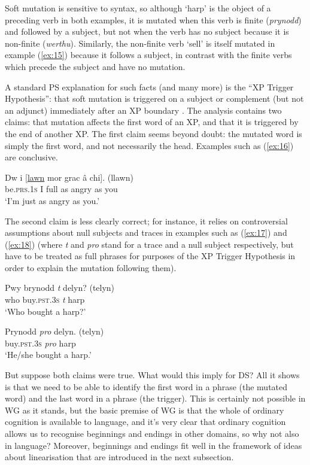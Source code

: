 \documentclass[output=paper
 	        ,biblatex
                ,babelshorthands
                ,newtxmath
                ,draftmode
                ,colorlinks, citecolor=brown
]{langscibook}
\begin{document}
Soft mutation is sensitive to syntax, so although ‘harp’ is the object of a preceding verb in both examples, it is mutated when this verb is finite (\emph{prynodd}) and followed by a subject, but not when the verb has no subject because it is non-finite (\emph{werthu}). Similarly, the non-finite verb ‘sell’ is itself mutated in example (\ref{ex:15}) because it follows a subject, in contrast with the finite verbs which precede the subject and have no mutation.

A standard PS explanation for such facts (and many more) is the ``XP Trigger Hypothesis'': that soft mutation is triggered on a subject or complement (but not an adjunct) immediately after an XP boundary \citep[226]{BorsleyTallermanWillis2007}. The analysis contains two claims: that mutation affects the first word of an XP, and that it is triggered by the end of another XP. The first claim seems beyond doubt: the mutated word is simply the first word, and not necessarily the head. Examples such as (\ref{ex:16}) are conclusive.

\ea
\label{ex:16}
\gll Dw i [\underline{lawn} mor grac â chi]. (llawn)\\
     be.\textsc{prs}.1\textsc{s} I full as angry as you\\
\glt ‘I’m just as angry as you.’
\z

The second claim is less clearly correct; for instance, it relies on controversial assumptions about null subjects and traces in examples such as (\ref{ex:17}) and (\ref{ex:18}) (where \emph{t} and \emph{pro} stand for a trace and a null subject respectively, but have to be treated as full phrases for purposes of the XP Trigger Hypothesis in order to explain the mutation following them).

\begin{exe}
	\ex \label{ex:17}
	\gll Pwy brynodd \emph{t} delyn? (telyn)\\
	who buy.\textsc{pst}.3\textsc{s} \emph{t} harp\\
	\glt ‘Who bought a harp?’

	\ex \label{ex:18}
	\gll Prynodd \emph{pro} delyn. (telyn)\\
	buy.\textsc{pst}.3\textsc{s} \emph{pro} harp\\
	\glt ‘He/she bought a harp.’
\end{exe}

But suppose both claims were true. What would this imply for DS? All it shows is that we need to be able to identify the first word in a phrase (the mutated word) and the last word in a phrase (the trigger). This is certainly not possible in WG as it stands, but the basic premise of WG is that the whole of ordinary cognition is available to language, and it’s very clear that ordinary cognition allows us to recognise beginnings and endings in other domains, so why not also in language? Moreover, beginnings and endings fit well in the framework of ideas about linearisation that are introduced in the next subsection.
\end{document}
